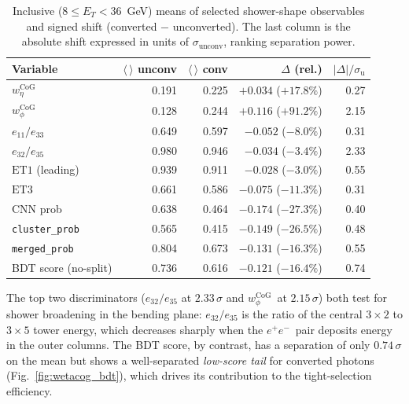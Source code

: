 \documentclass[11pt,a4paper]{article}
\newcommand{\wetacog}{\texorpdfstring{$w_{\eta}^{\mathrm{CoG}}$}{w\_eta\textasciicircum CoG}}
\newcommand{\wphicog}{\texorpdfstring{$w_{\phi}^{\mathrm{CoG}}$}{w\_phi\textasciicircum CoG}}
\newcommand{\epem}{\ensuremath{e^{+}e^{-}}}
\begin{document}
\begin{table}[H]
\centering
\caption{Inclusive ($8 \le E_T < 36$~GeV) means of selected shower-shape
observables and signed shift (converted $-$ unconverted). The last column
is the absolute shift expressed in units of $\sigma_{\mathrm{unconv}}$,
ranking separation power.
}
\label{tab:showershape_inclusive}
\begin{tabular}{lrrrr}
\toprule
Variable       & $\langle\,\rangle$ unconv & $\langle\,\rangle$ conv & $\Delta$ (rel.) & $|\Delta|/\sigma_{\mathrm{u}}$ \\
\midrule
\wetacog                 & 0.191 & 0.225 & $+0.034$ ($+17.8\%$) & 0.27 \\
\wphicog                 & 0.128 & 0.244 & $+0.116$ ($+91.2\%$) & 2.15 \\
$e_{11}/e_{33}$          & 0.649 & 0.597 & $-0.052$ ($-8.0\%$)  & 0.31 \\
$e_{32}/e_{35}$          & 0.980 & 0.946 & $-0.034$ ($-3.4\%$)  & 2.33 \\
$\mathrm{ET1}$ (leading) & 0.939 & 0.911 & $-0.028$ ($-3.0\%$)  & 0.55 \\
$\mathrm{ET3}$           & 0.661 & 0.586 & $-0.075$ ($-11.3\%$) & 0.31 \\
CNN prob                 & 0.638 & 0.464 & $-0.174$ ($-27.3\%$) & 0.40 \\
\texttt{cluster\_prob}   & 0.565 & 0.415 & $-0.149$ ($-26.5\%$) & 0.48 \\
\texttt{merged\_prob}    & 0.804 & 0.673 & $-0.131$ ($-16.3\%$) & 0.55 \\
BDT score (no-split)     & 0.736 & 0.616 & $-0.121$ ($-16.4\%$) & 0.74 \\
\bottomrule
\end{tabular}
\end{table}

The top two discriminators ($e_{32}/e_{35}$ at $2.33\,\sigma$ and \wphicog\
at $2.15\,\sigma$) both test for shower broadening in the bending plane:
$e_{32}/e_{35}$ is the ratio of the central $3\times 2$ to $3\times 5$ tower
energy, which decreases sharply when the \epem\ pair deposits energy in the
outer columns. The BDT score, by contrast, has a separation of only
$0.74\,\sigma$ on the mean but shows a well-separated \emph{low-score tail}
for converted photons (Fig.~\ref{fig:wetacog_bdt}), which drives its
contribution to the tight-selection efficiency.
\end{document}
